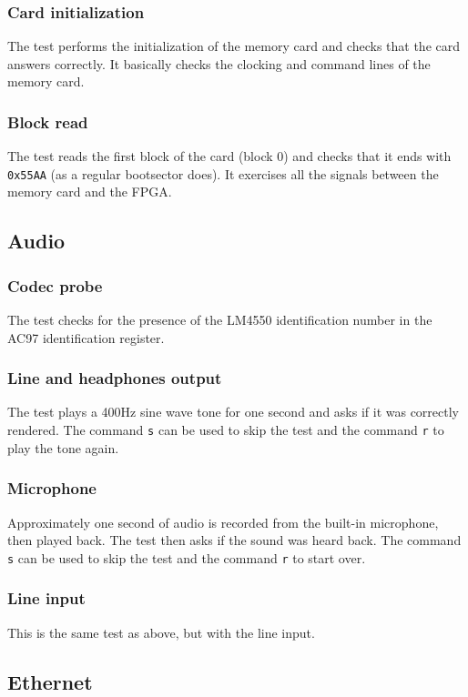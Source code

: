 \documentclass[a4paper,11pt]{article}
\begin{document}
\subsubsection{Card initialization}
The test performs the initialization of the memory card and checks that the card answers correctly. It basically checks the clocking and command lines of the memory card.

\subsubsection{Block read}
The test reads the first block of the card (block 0) and checks that it ends with \verb!0x55AA! (as a regular bootsector does). It exercises all the signals between the memory card and the FPGA.

\subsection{Audio}
\subsubsection{Codec probe}
The test checks for the presence of the LM4550 identification number in the AC97 identification register.

\subsubsection{Line and headphones output}
The test plays a 400Hz sine wave tone for one second and asks if it was correctly rendered. The command \verb!s! can be used to skip the test and the command \verb!r! to play the tone again.

\subsubsection{Microphone}
Approximately one second of audio is recorded from the built-in microphone, then played back. The test then asks if the sound was heard back. The command \verb!s! can be used to skip the test and the command \verb!r! to start over.

\subsubsection{Line input}
This is the same test as above, but with the line input.

\subsection{Ethernet}
\end{document}
